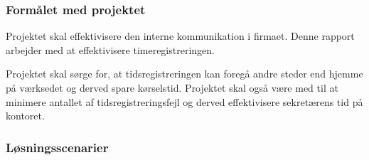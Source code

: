 \subsubsection{Formålet med projektet}
    Projektet skal effektivisere den interne kommunikation i     firmaet.
    Denne rapport arbejder med at effektivisere timeregistreringen.
    
   Projektet skal sørge for, at tidsregistreringen kan foregå andre steder end hjemme på værksedet og derved spare kørselstid.
   Projektet skal også være med til at minimere antallet af tidsregistreringsfejl og derved effektivisere sekretærens tid på kontoret.
    
\subsubsection{Løsningsscenarier}

